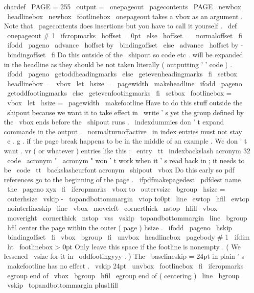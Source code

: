 chardef
\
PAGE
=
255
\
output
=
{
\
onepageout
{
\
pagecontents
\
PAGE
}
}
\
newbox
\
headlinebox
\
newbox
\
footlinebox
%
\
onepageout
takes
a
vbox
as
an
argument
.
Note
that
\
pagecontents
%
does
insertions
but
you
have
to
call
it
yourself
.
\
def
\
onepageout
#
1
{
%
\
ifcropmarks
\
hoffset
=
0pt
\
else
\
hoffset
=
\
normaloffset
\
fi
%
\
ifodd
\
pageno
\
advance
\
hoffset
by
\
bindingoffset
\
else
\
advance
\
hoffset
by
-
\
bindingoffset
\
fi
%
%
Do
this
outside
of
the
\
shipout
so
code
etc
.
will
be
expanded
in
%
the
headline
as
they
should
be
not
taken
literally
(
outputting
'
'
code
)
.
\
ifodd
\
pageno
\
getoddheadingmarks
\
else
\
getevenheadingmarks
\
fi
\
setbox
\
headlinebox
=
\
vbox
{
\
let
\
hsize
=
\
pagewidth
\
makeheadline
}
%
\
ifodd
\
pageno
\
getoddfootingmarks
\
else
\
getevenfootingmarks
\
fi
\
setbox
\
footlinebox
=
\
vbox
{
\
let
\
hsize
=
\
pagewidth
\
makefootline
}
%
%
{
%
%
Have
to
do
this
stuff
outside
the
\
shipout
because
we
want
it
to
%
take
effect
in
\
write
'
s
yet
the
group
defined
by
the
\
vbox
ends
%
before
the
\
shipout
runs
.
%
\
indexdummies
%
don
'
t
expand
commands
in
the
output
.
\
normalturnoffactive
%
\
in
index
entries
must
not
stay
\
e
.
g
.
if
%
the
page
break
happens
to
be
in
the
middle
of
an
example
.
%
We
don
'
t
want
.
vr
(
or
whatever
)
entries
like
this
:
%
\
entry
{
{
\
tt
\
indexbackslash
}
acronym
}
{
32
}
{
\
code
{
\
acronym
}
}
%
"
\
acronym
"
won
'
t
work
when
it
'
s
read
back
in
;
%
it
needs
to
be
%
{
\
code
{
{
\
tt
\
backslashcurfont
}
acronym
}
\
shipout
\
vbox
{
%
%
Do
this
early
so
pdf
references
go
to
the
beginning
of
the
page
.
\
ifpdfmakepagedest
\
pdfdest
name
{
\
the
\
pageno
}
xyz
\
fi
%
\
ifcropmarks
\
vbox
to
\
outervsize
\
bgroup
\
hsize
=
\
outerhsize
\
vskip
-
\
topandbottommargin
\
vtop
to0pt
{
%
\
line
{
\
ewtop
\
hfil
\
ewtop
}
%
\
nointerlineskip
\
line
{
%
\
vbox
{
\
moveleft
\
cornerthick
\
nstop
}
%
\
hfill
\
vbox
{
\
moveright
\
cornerthick
\
nstop
}
%
}
%
\
vss
}
%
\
vskip
\
topandbottommargin
\
line
\
bgroup
\
hfil
%
center
the
page
within
the
outer
(
page
)
hsize
.
\
ifodd
\
pageno
\
hskip
\
bindingoffset
\
fi
\
vbox
\
bgroup
\
fi
%
\
unvbox
\
headlinebox
\
pagebody
{
#
1
}
%
\
ifdim
\
ht
\
footlinebox
>
0pt
%
Only
leave
this
space
if
the
footline
is
nonempty
.
%
(
We
lessened
\
vsize
for
it
in
\
oddfootingyyy
.
)
%
The
\
baselineskip
=
24pt
in
plain
'
s
\
makefootline
has
no
effect
.
\
vskip
24pt
\
unvbox
\
footlinebox
\
fi
%
\
ifcropmarks
\
egroup
%
end
of
\
vbox
\
bgroup
\
hfil
\
egroup
%
end
of
(
centering
)
\
line
\
bgroup
\
vskip
\
topandbottommargin
plus1fill
}}}}
